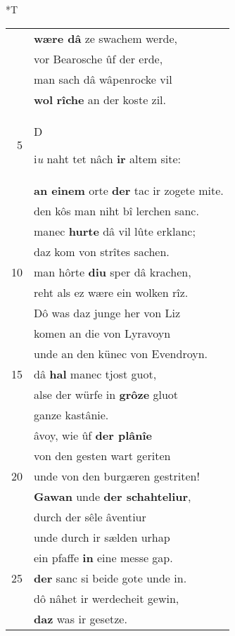 \documentclass[8pt,a4paper,notitlepage]{article}
\begin{document}
\begin{table}[ht]
\begin{minipage}[t]{0.5\linewidth}
\end{minipage}
\hspace{0.5cm}
\begin{minipage}[t]{0.5\linewidth}
\small
\begin{center}*T
\end{center}
\begin{tabular}{rl}
 & \textbf{wære dâ} ze swachem werde,\\ 
 & vor Bearosche ûf der erde,\\ 
 & man sach dâ wâpenrocke vil\\ 
 & \textbf{wol} \textbf{rîche} an der koste zil.\\ 
5 & \begin{large}D\end{large}i\textit{u} naht tet nâch \textbf{ir} altem site:\\ 
 & \textbf{an einem} orte \textbf{der} tac ir zogete mite.\\ 
 & den kôs man niht bî lerchen sanc.\\ 
 & manec \textbf{hurte} dâ vil lûte erklanc;\\ 
 & daz kom von strîtes sachen.\\ 
10 & man hôrte \textbf{diu} sper dâ krachen,\\ 
 & reht als ez wære ein wolken rîz.\\ 
 & Dô was daz junge her von Liz\\ 
 & komen an die von Lyravoyn\\ 
 & unde an den künec von Evendroyn.\\ 
15 & dâ \textbf{hal} manec tjost guot,\\ 
 & alse der würfe in \textbf{grôze} gluot\\ 
 & ganze kastânie.\\ 
 & âvoy, wie ûf \textbf{der plânîe}\\ 
 & von den gesten wart geriten\\ 
20 & unde von den burgæren gestriten!\\ 
 & \textbf{Gawan} unde \textbf{der schahteliur},\\ 
 & durch der sêle âventiur\\ 
 & unde durch ir sælden urhap\\ 
 & ein pfaffe \textbf{in} eine messe gap.\\ 
25 & \textbf{der} sanc si beide gote unde in.\\ 
 & dô nâhet ir werdecheit gewin,\\ 
 & \textbf{daz} was ir gesetze.\\ 

\end{tabular}
\end{minipage}
\end{table}
\end{document}
